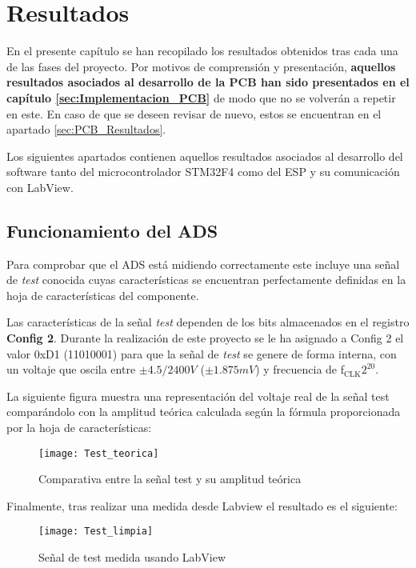 \chapter{Resultados\label{sec:Resultados}}

En el presente capítulo se han recopilado los resultados obtenidos tras cada una de las fases del proyecto. Por motivos de comprensión y presentación, \textbf{aquellos resultados asociados al desarrollo de la \acrshort{PCB} han sido presentados en el capítulo \ref{sec:Implementacion_PCB}} de modo que no se volverán a repetir en este. En caso de que se deseen revisar de nuevo, estos se encuentran en el apartado \ref{sec:PCB_Resultados}.

Los siguientes apartados contienen aquellos resultados asociados al desarrollo del software tanto del microcontrolador STM32F4 como del ESP y su comunicación con LabView.

\section{Funcionamiento del ADS\label{Resultados_ADS}}

Para comprobar que el ADS está midiendo correctamente este incluye una señal de \textit{test} conocida cuyas características se encuentran perfectamente definidas en la hoja de características del componente.

Las características de la señal \textit{test} dependen de los bits almacenados en el registro \textbf{Config 2}. Durante la realización de este proyecto se le ha asignado a Config 2 el valor 0xD1 (11010001) para que la señal de \textit{test} se genere de forma interna, con un voltaje que oscila entre $\pm4.5/2400V$ ($\pm1.875mV$) y frecuencia de f$_\text{CLK}$\/$2^{20}$.

La siguiente figura muestra una representación del voltaje real de la señal test comparándolo con la amplitud teórica calculada según la fórmula proporcionada por la hoja de características:

\begin{figure} [H]
    \centering
    \texttt{[image: Test\_teorica]}
    \caption{Comparativa entre la señal test y su amplitud teórica}
    \label{fig:tes_teorica}
\end{figure}

Finalmente, tras realizar una medida desde Labview el resultado es el siguiente:

\begin{figure} [H]
    \centering
    \texttt{[image: Test\_limpia]}
    \caption{Señal de test medida usando LabView}
    \label{fig:Test_limpia}
\end{figure}

